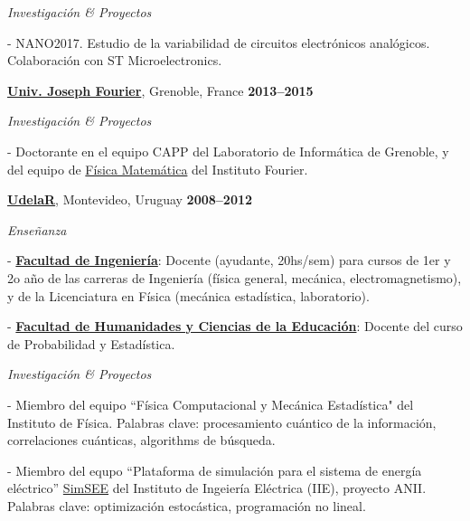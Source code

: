 \documentclass[10pt]{article}
\newenvironment{outerlist}[1][\enskip\textbullet]%
        {\begin{itemize}[#1]}{\end{itemize}%
         \vspace{-.6\baselineskip}}
\newenvironment{innerlist}[1][\enskip\textbullet]%
        {\begin{compactitem}[#1]}{\end{compactitem}}
\newcommand{\blankline}{\quad\pagebreak[2]}
\begin{document}
\begin{outerlist}
	\item[]\textit{Investigación \& Proyectos}
	\begin{innerlist}
		\item[-] NANO2017. Estudio de la variabilidad de circuitos electrónicos analógicos. Colaboración con ST Microelectronics.
	\end{innerlist}
\end{outerlist}

\blankline

\href{http://www.ujf-grenoble.fr/}{\textbf{Univ. Joseph Fourier}}, Grenoble, France
\hfill\textbf{2013--2015}

\begin{outerlist}
\item[]\textit{Investigación \& Proyectos}
\begin{innerlist}
\item[-] Doctorante en el equipo CAPP del Laboratorio de Informática de Grenoble, y del equipo de \href{http://www-fourier.ujf-grenoble.fr/?q=fr/content/physique-mathematique}{Física Matemática} del Instituto Fourier.
\end{innerlist}
\end{outerlist}

\blankline

\href{http://www.udelar.edu.uy}{\textbf{UdelaR}}, Montevideo, Uruguay 
\hfill\textbf{2008--2012}

\begin{outerlist}
\item[]\textit{Enseñanza}
\begin{innerlist}
\item[-] \href{http://www.fing.edu.uy}{\textbf{Facultad de Ingenier\'ia}}: Docente (ayudante, 20hs/sem) para cursos de 1er y 2o año de las carreras de Ingeniería (física general, mecánica, electromagnetismo), y de la Licenciatura en Física (mecánica estadística, laboratorio).
\item[-] \href{http://www.fhuce.edu.uy/}{\textbf{Facultad de Humanidades y Ciencias de la Educaci\'{o}n}}: Docente del curso de Probabilidad y Estadística.
\end{innerlist}

\item[]\textit{Investigación \& Proyectos}
\begin{innerlist}
\item[-] Miembro del equipo ``Física Computacional y Mecánica Estadística" del Instituto de Física. Palabras clave: procesamiento cuántico de la información, correlaciones cuánticas, algorithms de búsqueda. 
\item[-] Miembro del equpo ``Plataforma de simulaci\'{o}n para el sistema de energ\'{i}a el\'{e}ctrico'' \href{http://iie.fing.edu.uy/simsee/}{SimSEE} del Instituto de Ingeiería Eléctrica (IIE), proyecto ANII. Palabras clave: optimización estocástica, programación no lineal.
\end{innerlist}

\end{outerlist}
\end{document}
